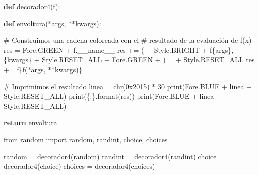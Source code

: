 \documentclass[
  spanish,
  letterpaper,
]{scrbook}
\newenvironment{Shaded}{\begin{snugshade}}{\end{snugshade}}
\newcommand{\BaseNTok}[1]{\textcolor[rgb]{0.68,0.00,0.00}{#1}}
\newcommand{\BuiltInTok}[1]{\textcolor[rgb]{0.00,0.23,0.31}{#1}}
\newcommand{\CommentTok}[1]{\textcolor[rgb]{0.37,0.37,0.37}{#1}}
\newcommand{\ControlFlowTok}[1]{\textcolor[rgb]{0.00,0.23,0.31}{\textbf{#1}}}
\newcommand{\DecValTok}[1]{\textcolor[rgb]{0.68,0.00,0.00}{#1}}
\newcommand{\ImportTok}[1]{\textcolor[rgb]{0.00,0.46,0.62}{#1}}
\newcommand{\KeywordTok}[1]{\textcolor[rgb]{0.00,0.23,0.31}{\textbf{#1}}}
\newcommand{\NormalTok}[1]{\textcolor[rgb]{0.00,0.23,0.31}{#1}}
\newcommand{\OperatorTok}[1]{\textcolor[rgb]{0.37,0.37,0.37}{#1}}
\newcommand{\SpecialCharTok}[1]{\textcolor[rgb]{0.37,0.37,0.37}{#1}}
\newcommand{\SpecialStringTok}[1]{\textcolor[rgb]{0.13,0.47,0.30}{#1}}
\newcommand{\StringTok}[1]{\textcolor[rgb]{0.13,0.47,0.30}{#1}}
\newcommand{\VariableTok}[1]{\textcolor[rgb]{0.07,0.07,0.07}{#1}}
\theoremstyle{definition}
\theoremstyle{remark}
\begin{document}
\begin{Shaded}
\begin{Highlighting}[]
\KeywordTok{def}\NormalTok{ decorador4(f):}
    
    \KeywordTok{def}\NormalTok{ envoltura(}\OperatorTok{*}\NormalTok{args, }\OperatorTok{**}\NormalTok{kwargs):}

        \CommentTok{\# Construimos una cadena coloreada con el }
        \CommentTok{\# resultado de la evaluación de f(x)}
\NormalTok{        res }\OperatorTok{=}\NormalTok{ Fore.GREEN }\OperatorTok{+}\NormalTok{ f.}\VariableTok{\_\_name\_\_} 
\NormalTok{        res }\OperatorTok{+=} \StringTok{\textquotesingle{}(\textquotesingle{}} \OperatorTok{+}\NormalTok{ Style.BRIGHT }\OperatorTok{+} \SpecialStringTok{f\textquotesingle{}}\SpecialCharTok{\{}\NormalTok{args}\SpecialCharTok{\}}\SpecialStringTok{,}\SpecialCharTok{\{}\NormalTok{kwargs}\SpecialCharTok{\}}\SpecialStringTok{\textquotesingle{}} \OperatorTok{+}\NormalTok{ Style.RESET\_ALL }\OperatorTok{+}\NormalTok{ Fore.GREEN }\OperatorTok{+} \StringTok{\textquotesingle{}) = \textquotesingle{}} \OperatorTok{+}\NormalTok{ Style.RESET\_ALL}
\NormalTok{        res }\OperatorTok{+=} \SpecialStringTok{f\textquotesingle{}}\SpecialCharTok{\{}\NormalTok{f(}\OperatorTok{*}\NormalTok{args, }\OperatorTok{**}\NormalTok{kwargs)}\SpecialCharTok{\}}\SpecialStringTok{\textquotesingle{}}
        
        \CommentTok{\# Imprimimos el resultado}
\NormalTok{        linea }\OperatorTok{=} \BuiltInTok{chr}\NormalTok{(}\BaseNTok{0x2015}\NormalTok{) }\OperatorTok{*} \DecValTok{30}
        \BuiltInTok{print}\NormalTok{(Fore.BLUE }\OperatorTok{+}\NormalTok{ linea }\OperatorTok{+}\NormalTok{ Style.RESET\_ALL)}
        \BuiltInTok{print}\NormalTok{(}\StringTok{\textquotesingle{}}\SpecialCharTok{\{:\}}\StringTok{\textquotesingle{}}\NormalTok{.}\BuiltInTok{format}\NormalTok{(res))}
        \BuiltInTok{print}\NormalTok{(Fore.BLUE }\OperatorTok{+}\NormalTok{ linea }\OperatorTok{+}\NormalTok{ Style.RESET\_ALL)}
        
    \ControlFlowTok{return}\NormalTok{ envoltura}
\end{Highlighting}
\end{Shaded}

\begin{Shaded}
\begin{Highlighting}[]
\ImportTok{from}\NormalTok{ random }\ImportTok{import}\NormalTok{ random, randint, choice, choices}

\NormalTok{random }\OperatorTok{=}\NormalTok{ decorador4(random)}
\NormalTok{randint }\OperatorTok{=}\NormalTok{ decorador4(randint)}
\NormalTok{choice }\OperatorTok{=}\NormalTok{ decorador4(choice)}
\NormalTok{choices }\OperatorTok{=}\NormalTok{ decorador4(choices)}
\end{Highlighting}
\end{Shaded}
\end{document}

